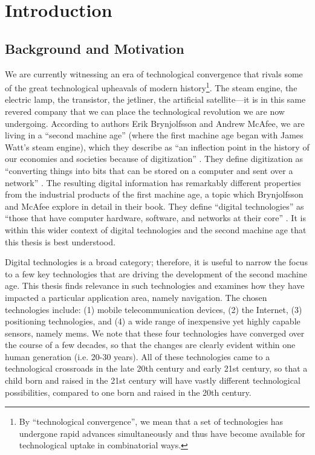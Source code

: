\chapter{Introduction}
\label{ch:intro}

\section{Background and Motivation}
\label{sec:motivation}

We are currently witnessing an era of technological convergence that rivals some of the great technological upheavals of modern history\footnote{By ``technological convergence'', we mean that a set of technologies has undergone rapid advances simultaneously and thus have become available for technological uptake in combinatorial ways.}. The steam engine, the electric lamp, the transistor, the jetliner, the artificial satellite---it is in this same revered company that we can place the technological revolution we are now undergoing. According to authors Erik Brynjolfsson and Andrew McAfee, we are living in a ``second machine age'' (where the first machine age began with James Watt's steam engine), which they describe as ``an inflection point in the history of our economies and societies because of digitization'' \cite[p. 11]{brynjolfsson_2014}. They define digitization as ``converting things into bits that can be stored on a computer and sent over a network'' \cite[p. 10]{brynjolfsson_2014}. The resulting digital information has remarkably different properties from the industrial products of the first machine age, a topic which Brynjolfsson and McAfee explore in detail in their book. They define ``digital technologies'' as ``those that have computer hardware, software, and networks at their core'' \cite[p. 9]{brynjolfsson_2014}. It is within this wider context of digital technologies and the second machine age that this thesis is best understood.

Digital technologies is a broad category; therefore, it is useful to narrow the focus to a few key technologies that are driving the development of the second machine age. This thesis finds relevance in such technologies and examines how they have impacted a particular application area, namely navigation. The chosen technologies include: (1) mobile telecommunication devices, (2) the Internet, (3) positioning technologies, and (4) a wide range of inexpensive yet highly capable sensors, namely \gls{mems}. We note that these four technologies have converged over the course of a few decades, so that the changes are clearly evident within one human generation (i.e. 20-30 years). All of these technologies came to a technological crossroads in the late 20th century and early 21st century, so that a child born and raised in the 21st century will have vastly different technological possibilities, compared to one born and raised in the 20th century.

